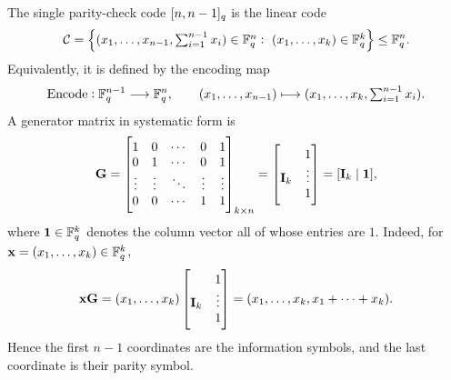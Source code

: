 \vspace{30pt}

\begin{example}
	The single parity-check code \([n,n-1]_{q}\) is the linear code
	\[
	\mathcal{C}=\left\{(x_1,\dots,x_{n-1},\textstyle\sum_{i=1}^{n-1}x_i)\in \mathbb{F}_q^n:\ (x_1,\dots,x_k)\in\mathbb{F}_q^k\right\}\leq\mathbb{F}_q^n.
	\]
	Equivalently, it is defined by the encoding map
	\[
	\operatorname{Encode}:\mathbb{F}_q^{n-1}\longrightarrow \mathbb{F}_q^n,\qquad
	(x_1,\dots,x_{n-1})\longmapsto (x_1,\dots,x_k,\textstyle\sum_{i=1}^{n-1}x_i).
	\]
	A generator matrix in systematic form is
	\[
	\mathbf{G}=
	\begin{bmatrix}
		1 & 0 & \cdots & 0 & 1 \\
		0 & 1 & \cdots & 0 & 1 \\
		\vdots & \vdots & \ddots & \vdots & \vdots \\
		0 & 0 & \cdots & 1 & 1
	\end{bmatrix}_{k\times n}
	=
	\begin{bmatrix}
		& 1 \\
		\mathbf{I}_k & \vdots \\
		& 1
	\end{bmatrix}
	=
	[\mathbf{I}_k\mid \mathbf{1}],
	\]
	where \(\mathbf{1}\in\mathbb{F}_q^k\) denotes the column vector all of whose entries are \(1\).
	Indeed, for \(\mathbf{x}=(x_1,\dots,x_k)\in\mathbb{F}_q^k\),
	\[
	\mathbf{x}\mathbf{G}
	=
	(x_1,\dots,x_k)
	\begin{bmatrix}
		& 1 \\
		\mathbf{I}_k & \vdots \\
		& 1
	\end{bmatrix}
	=
	(x_1,\dots,x_k,x_1+\cdots+x_k).
	\]
	Hence the first \(n-1\) coordinates are the information symbols, and the last coordinate is their parity symbol.
\end{example}


